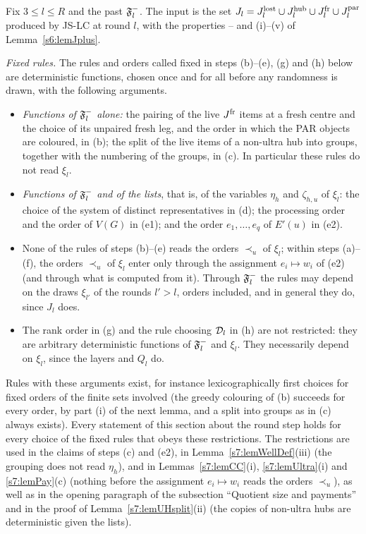 \begin{construction}\label{s7:consRound}
Fix $3\le l\le R$ and the past $\mathfrak{F}^{-}_l$. The input is the set
$J_l=J^{\mathrm{lost}}_l\cup J^{\mathrm{hub}}_l\cup J^{\mathrm{fr}}_l\cup J^{\mathrm{par}}_l$ produced by JS-LC at round $l$,
with the properties -- and (i)--(v) of Lemma~\ref{s6:lemJplus}.

\emph{Fixed rules.} The rules and orders called fixed in steps (b)--(e), (g)
and (h) below are deterministic functions, chosen once and for all before any
randomness is drawn, with the following arguments.
\begin{itemize}
\item \emph{Functions of $\mathfrak{F}^{-}_l$ alone:} the pairing of the live $J^{\mathrm{fr}}$ items
at a fresh centre and the choice of its unpaired fresh leg, and the order in
which the PAR objects are coloured, in (b); the split of the live items of a
non-ultra hub into groups, together with the numbering of the groups, in (c).
In particular these rules do not read $\xi_l$.
\item \emph{Functions of $\mathfrak{F}^{-}_l$ and of the lists}, that is, of the variables
$\eta_h$ and $\zeta_{h,u}$ of $\xi_l$: the choice of the system of distinct
representatives in (d); the processing order and the order of $V(G)$ in (e1);
and the order $e_1,\dots,e_q$ of $E'(u)$ in (e2).
\item None of the rules of steps (b)--(e) reads the orders $\prec_u$ of
$\xi_l$; within steps (a)--(f), the orders $\prec_u$ of $\xi_l$ enter only
through the assignment $e_i\mapsto w_i$ of (e2) (and through what is computed
from it). Through $\mathfrak{F}^{-}_l$ the rules may depend on the draws
$\xi_{l'}$ of the rounds $l'>l$, orders included, and in general they do,
since $J_l$ does.
\item The rank order in (g) and the rule choosing $\mathcal{D}_l$ in (h) are not
restricted: they are arbitrary deterministic functions of $\mathfrak{F}^{-}_l$ and
$\xi_l$. They necessarily depend on $\xi_l$, since the layers and $Q_l$ do.
\end{itemize}
Rules with these arguments exist, for instance lexicographically first choices
for fixed orders of the finite sets involved (the greedy colouring of (b)
succeeds for every order, by part (i) of the next lemma, and a split into groups
as in (c) always exists). Every statement of this section about the
round step holds for every choice of the fixed rules that obeys these
restrictions. The restrictions are used in the claims of steps (c) and (e2), in
Lemma~\ref{s7:lemWellDef}(iii) (the grouping does not read $\eta_h$), and in
Lemmas~\ref{s7:lemCC}(i), \ref{s7:lemUltra}(i) and \ref{s7:lemPay}(c) (nothing
before the assignment $e_i\mapsto w_i$ reads the orders $\prec_u$), as well as
in the opening paragraph of the subsection ``Quotient size and payments'' and
in the proof of Lemma~\ref{s7:lemUHsplit}(ii) (the copies of non-ultra hubs are
deterministic given the lists).


\end{construction}
